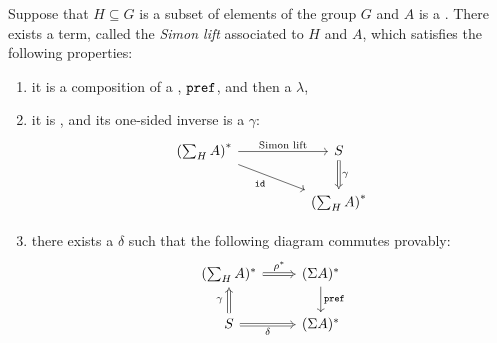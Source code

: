 \begin{lemma}\label{lem:simon-lift}
    Suppose that $H \subseteq G$ is a subset of elements of the group $G$ and $A$ is a . There exists a term, called the \emph{Simon lift} associated to $H$ and $A$, which satisfies the following properties:
    \begin{enumerate}
        \item it is a composition of a , $\mathtt{pref}$, and then a  $\lambda$,
        \item it is , and its one-sided inverse is a  $\gamma$:
        \[
        \begin{tikzcd}[column sep=huge]
            \left(\sum_H A \right)^* 
            \ar[r, "\text{Simon lift}"]
            \ar[dr, "\idterm"'{xshift=-0.5ex}]
            &S
            \ar[d, \dropar, "\gamma"]
            \\
            &\left(\sum_H A \right)^*
        \end{tikzcd}
        \]
        \item there exists a  $\delta$ such that the following diagram commutes provably:
        \[
        \begin{tikzcd}
            (\sum_H A)^* 
            \ar[r, \dropar, "\rho^*"]
            &(\Sigma A)^*
            \ar[d, "\prefterm"]
            \\ 
            S
            \ar[r, \dropar, "\delta"']
            \ar[u, \dropar, "\gamma"{xshift=-0.5ex}]
            &(\Sigma A)^*
        \end{tikzcd}
        \]
    \end{enumerate}
\end{lemma}
